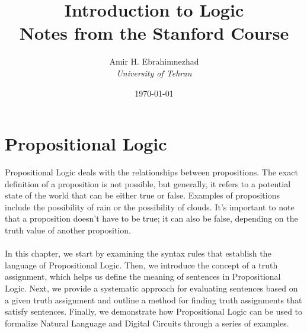 \documentclass[10pt,a4pape,twocolumn]{article}
\title{Introduction to Logic \\ \large Notes from the Stanford Course}
\author{Amir H. Ebrahimnezhad \\ \small \textit{University of Tehran}}
\date{\today}
\begin{document}
        \maketitle
        \tableofcontents
        \section{Propositional Logic}
          Propositional Logic deals with the relationships between propositions. The exact definition of a proposition is not possible, but generally, it refers to a potential state of the world that can be either true or false. Examples of propositions include the possibility of rain or the possibility of clouds. It's important to note that a proposition doesn't have to be true; it can also be false, depending on the truth value of another proposition.
          \\
          \\
          In this chapter, we start by examining the syntax rules that establish the language of Propositional Logic. Then, we introduce the concept of a truth assignment, which helps us define the meaning of sentences in Propositional Logic. Next, we provide a systematic approach for evaluating sentences based on a given truth assignment and outline a method for finding truth assignments that satisfy sentences. Finally, we demonstrate how Propositional Logic can be used to formalize Natural Language and Digital Circuits through a series of examples.
\end{document}
